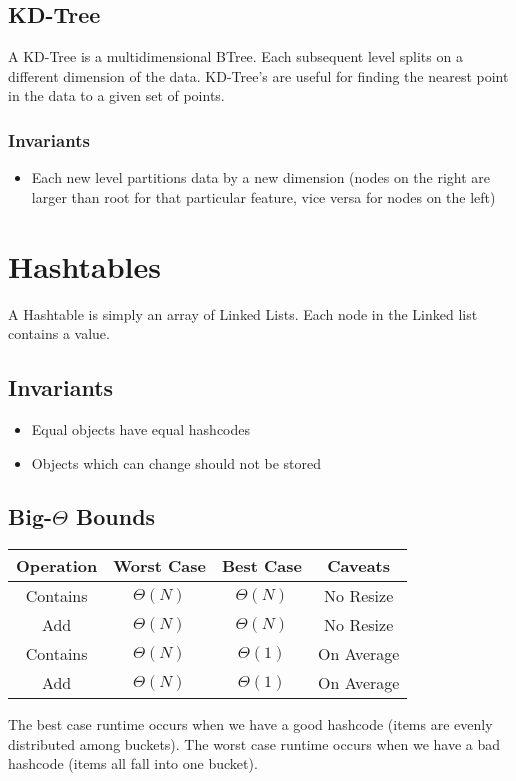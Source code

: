\documentclass{article}
\begin{document}
\subsection{KD-Tree}
A KD-Tree is a multidimensional BTree. Each subsequent level splits on a different dimension of the data.
KD-Tree's are useful for finding the nearest point in the data to a given set of points.
\subsubsection{Invariants}
\begin{itemize}
    \item Each new level partitions data by a new dimension (nodes on the right are larger than root for that particular feature, vice versa for nodes on the left)
\end{itemize}
\section{Hashtables}
A Hashtable is simply an array of Linked Lists. Each node in the Linked list contains a value.
\subsection{Invariants}
\begin{itemize}
    \item Equal objects have equal hashcodes
    \item Objects which can change should not be stored
\end{itemize}
\subsection{Big-$\Theta$ Bounds}
\begin{center}
    \begin{tabular}{ c | c | c | c }
     Operation & Worst Case & Best Case & Caveats\\
     \hline
     Contains & $\Theta(N)$ & $\Theta(N)$ & No Resize\\ 
     Add & $\Theta(N)$ & $\Theta(N)$ & No Resize \\  
     Contains & $\Theta(N)$ & $\Theta(1)$ & On Average \\
     Add & $\Theta(N)$ & $\Theta(1)$ & On Average
    \end{tabular}
\end{center}
The best case runtime occurs when we have a good hashcode (items are evenly distributed among buckets).
The worst case runtime occurs when we have a bad hashcode (items all fall into one bucket).
\end{document}
